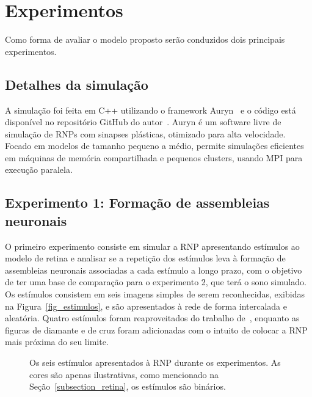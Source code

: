 \chapter{Experimentos}\label{cap_experimentos}

Como forma de avaliar o modelo proposto serão conduzidos dois principais experimentos.

\section{Detalhes da simulação}

A simulação foi feita em C++ utilizando o framework Auryn~\cite{zenkeLimits2014} e o código está disponível no repositório GitHub
do autor~\cite{cendronContribuicao2023}. Auryn é um software livre de simulação de RNPs com sinapses plásticas, otimizado para
alta velocidade. Focado em modelos de tamanho pequeno a médio, permite simulações eficientes em máquinas de memória compartilhada
e pequenos clusters, usando MPI para execução paralela.

\section{Experimento 1: Formação de assembleias neuronais}

O primeiro experimento consiste em simular a RNP apresentando estímulos ao modelo de retina e analisar se a repetição dos
estímulos leva à formação de assembleias neuronais associadas a cada estímulo a longo prazo, com o objetivo de ter uma base de
comparação para o experimento 2, que terá o sono simulado. Os estímulos consistem em seis imagens simples de serem reconhecidas,
exibidas na Figura~\ref{fig_estimulos}, e são apresentados à rede de forma intercalada e aleatória. Quatro estímulos foram
reaproveitados do trabalho de~, enquanto as figuras de diamante e de cruz foram adicionadas com o
intuito de colocar a RNP mais próxima do seu limite.

\begin{figure}[!ht]
\caption{Os seis estímulos apresentados à RNP durante os experimentos. As cores são apenas ilustrativas, como mencionado na Seção~\ref{subsection_retina}, os estímulos são binários.}
\end{figure}

